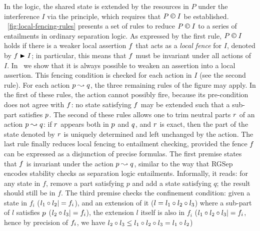 In the logic, the shared state is extended by the resources in
$P$ under the interference $I$ via the \extendRule principle,
which requires that $P\containI I$ be
established. \fig~\ref{fig:local-fencing-rules} presents a set of
rules to reduce $P \containI I$ to a series of entailments in
ordinary separation logic. As expressed by the first rule,
$P \containI I$ holds if there is a weaker local assertion $\lass{F}$
that acts as a \emph{local fence} for $I$, denoted by
$\lass{F}\strictfences I$; in particular, this means that $\lass{F}$
must be invariant under all actions of $I$. In~\cite{colosl-tr14}
we show that it is always possible to weaken an assertion into a local assertion. This fencing condition is
checked for each action in $I$ (see the second rule). For each action
$\lass{P}\swap \lass{Q}$, the three remaining rules of the figure may
apply. In the first of these rules, the action cannot possibly fire,
because its pre-condition does not agree with $\lass{F}$: no state
satisfying $\lass{F}$ may be extended such that a sub-part satisfies
$\lass{P}$. 
The second of these rules allows one to trim neutral parts
$\lass{R}$ of an action $\lass{P}\swap \lass{Q}$: if $\lass{R}$
appears both in $\lass{P}$ and $\lass{Q}$, and $\lass{R}$ is exact,
then the part of the state denoted by $\lass{R}$ is uniquely
determined and left unchanged by the action. 
The last rule finally reduces local fencing to entailment checking, provided the fence
$\lass{F}$ can be expressed as a disjunction of precise formulas. The
first premise states that $\lass{F}$ is invariant under the action
$\lass{P}\swap \lass{Q}$, similar to the way that RGSep encodes
stability checks as separation logic entailments. Informally, it
reads: for any state in $f$, remove a part satisfying $p$ and add a
state satisfying $q$; the result should still be in $f$. The third
premise checks the confinement condition: given a state in $f_i$ ($l_1\composeL l_2|= \lass{F}_i$), and an extension of it ($l = l_1 \circ l_2 \circ l_3$) where a sub-part of $l$ satisfies $\lass{P}$ ($l_2 \circ l_3 |= f_i$), the extension $l$ itself is also in $f_i$ ($l_1\composeL l_2\composeL
l_3|=\lass{F}_i$, hence by precision of $\lass{F}_i$, we have $l_2\circ
l_3\leq l_1\circ l_2\circ l_3 = l_1\circ l_2$)

